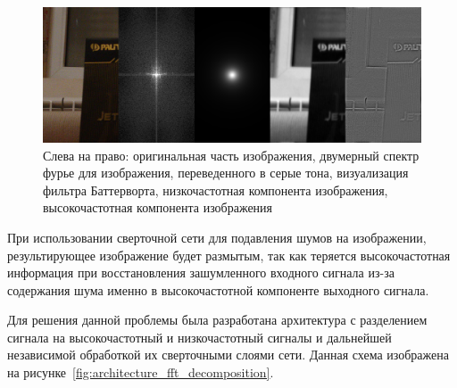 \documentclass[14pt]{mmcs_article}
\begin{document}
\begin{figure}[H]
	\centering
	\includegraphics[width=\textwidth]{img/fft_comparison}
	\caption{Слева на право: оригинальная часть изображения, двумерный спектр фурье для изображения, переведенного в серые тона, визуализация фильтра Баттерворта, низкочастотная компонента изображения, высокочастотная компонента изображения}
	\label{fig:fft_comparison}
\end{figure}

При использовании сверточной сети для подавления шумов на изображении, результирующее изображение будет размытым, так как теряется высокочастотная информация при восстановления зашумленного входного сигнала из-за содержания шума именно в высокочастотной компоненте выходного сигнала.

Для решения данной проблемы была разработана архитектура с разделением сигнала на высокочастотный и низкочастотный сигналы и дальнейшей независимой обработкой их сверточными слоями сети. Данная схема изображена на рисунке~\ref{fig:architecture_fft_decomposition}.
\end{document}
